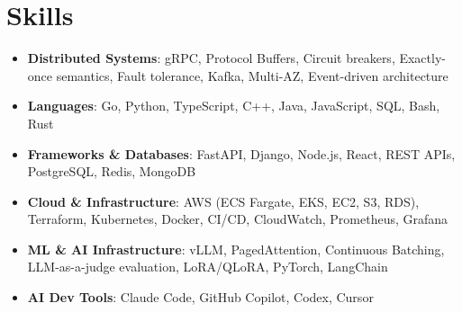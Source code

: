 \documentclass[letterpaper,11pt]{article}
\newcommand{\resumeSubHeadingListStart}{\begin{itemize}[leftmargin=0.15in, label={}]}
\newcommand{\resumeSubHeadingListEnd}{\end{itemize}}
\newcommand{\resumeSkillHeading}[2]{%
  \item\small{\textbf{#1}: #2 \vspace{-9pt}}%
}
\begin{document}
\section{Skills}
  \resumeSubHeadingListStart
    \resumeSkillHeading{Distributed Systems}{gRPC, Protocol Buffers, Circuit breakers, Exactly-once semantics, Fault tolerance, Kafka, Multi-AZ, Event-driven architecture}
    \resumeSkillHeading{Languages}{Go, Python, TypeScript, C++, Java, JavaScript, SQL, Bash, Rust}
    \resumeSkillHeading{Frameworks \& Databases}{FastAPI, Django, Node.js, React, REST APIs, PostgreSQL, Redis, MongoDB}
    \resumeSkillHeading{Cloud \& Infrastructure}{AWS (ECS Fargate, EKS, EC2, S3, RDS), Terraform, Kubernetes, Docker, CI/CD, CloudWatch, Prometheus, Grafana}
    \resumeSkillHeading{ML \& AI Infrastructure}{vLLM, PagedAttention, Continuous Batching, LLM-as-a-judge evaluation, LoRA/QLoRA, PyTorch, LangChain}
    \resumeSkillHeading{AI Dev Tools}{Claude Code, GitHub Copilot, Codex, Cursor}
  \resumeSubHeadingListEnd
\end{document}
